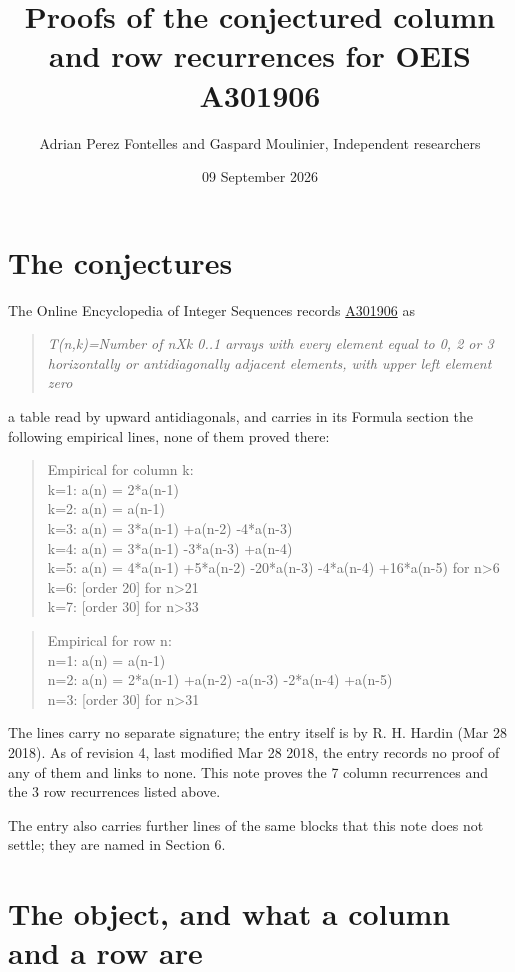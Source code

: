 \documentclass[11pt]{article}
\title{Proofs of the conjectured column and row recurrences for OEIS A301906}
\author{Adrian Perez Fontelles and Gaspard Moulinier, Independent researchers}
\date{09 September 2026}
\theoremstyle{definition}
\begin{document}
\maketitle
\section{The conjectures}

The Online Encyclopedia of Integer Sequences records \href{https://oeis.org/A301906}{A301906} as

\begin{quote}\itshape T(n,k)=Number of nXk 0..1 arrays with every element equal to 0, 2 or 3 horizontally or antidiagonally adjacent elements, with upper left element zero\end{quote}

a table read by upward antidiagonals, and carries in its Formula section the following empirical lines, none of them proved there:

\begin{quote}\ttfamily Empirical for column k:\\
k=1: a(n) = 2*a(n-1)\\k=2: a(n) = a(n-1)\\k=3: a(n) = 3*a(n-1) +a(n-2) -4*a(n-3)\\k=4: a(n) = 3*a(n-1) -3*a(n-3) +a(n-4)\\k=5: a(n) = 4*a(n-1) +5*a(n-2) -20*a(n-3) -4*a(n-4) +16*a(n-5) for n>6\\k=6: [order 20] for n>21\\k=7: [order 30] for n>33\end{quote}

\begin{quote}\ttfamily Empirical for row n:\\
n=1: a(n) = a(n-1)\\n=2: a(n) = 2*a(n-1) +a(n-2) -a(n-3) -2*a(n-4) +a(n-5)\\n=3: [order 30] for n>31\end{quote}

The lines carry no separate signature; the entry itself is by R. H. Hardin (Mar 28 2018). As of revision 4, last modified Mar 28 2018, the entry records no proof of any of them and links to none. This note proves the 7 column recurrences and the 3 row recurrences listed above.

The entry also carries further lines of the same blocks that this note does not settle; they are named in Section 6.

\section{The object, and what a column and a row are}
\end{document}
